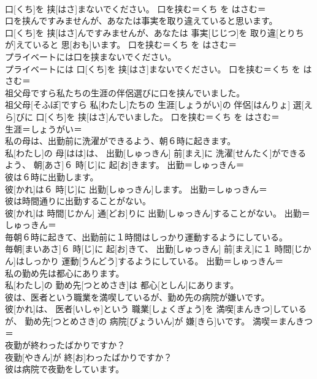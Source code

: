 \documentclass[8pt]{extreport}
\begin{document}
\begin{CJK}{UTF8}{min}
\\	口[くち]を 挟[はさ]まないでください。	口を挟む＝くち を はさむ＝ 
\\	口を挟んですみませんが、あなたは事実を取り違えていると思います。	
\\	口[くち]を 挟[はさ]んですみませんが、あなたは 事実[じじつ]を 取り違[とりちが]えていると 思[おも]います。	口を挟む＝くち を はさむ＝ 
\\	プライベートには口を挟まないでください。	
\\	プライベートには 口[くち]を 挟[はさ]まないでください。	口を挟む＝くち を はさむ＝ 
\\	祖父母ですら私たちの生涯の伴侶選びに口を挟んでいました。	
\\	祖父母[そふぼ]ですら 私[わたし]たちの 生涯[しょうがい]の 伴侶[はんりょ] 選[えら]びに 口[くち]を 挟[はさ]んでいました。	口を挟む＝くち を はさむ＝ 
\\	生涯＝しょうがい＝ 
\\	私の母は、出勤前に洗濯ができるよう、朝６時に起きます。	
\\	私[わたし]の 母[はは]は、 出勤[しゅっきん] 前[まえ]に 洗濯[せんたく]ができるよう、 朝[あさ]６ 時[じ]に 起[お]きます。	出勤＝しゅっきん＝ 
\\	彼は６時に出勤します。	
\\	彼[かれ]は６ 時[じ]に 出勤[しゅっきん]します。	出勤＝しゅっきん＝ 
\\	彼は時間通りに出勤することがない。	
\\	彼[かれ]は 時間[じかん] 通[どお]りに 出勤[しゅっきん]することがない。	出勤＝しゅっきん＝ 
\\	毎朝６時に起きて、出勤前に１時間はしっかり運動するようにしている。	
\\	毎朝[まいあさ]６ 時[じ]に 起[お]きて、 出勤[しゅっきん] 前[まえ]に１ 時間[じかん]はしっかり 運動[うんどう]するようにしている。	出勤＝しゅっきん＝ 
\\	私の勤め先は都心にあります。	
\\	私[わたし]の 勤め先[つとめさき]は 都心[としん]にあります。	
\\	彼は、医者という職業を満喫しているが、勤め先の病院が嫌いです。	
\\	彼[かれ]は、 医者[いしゃ]という 職業[しょくぎょう]を 満喫[まんきつ]しているが、 勤め先[つとめさき]の 病院[びょういん]が 嫌[きら]いです。	満喫＝まんきつ＝ 
\\	夜勤が終わったばかりですか？	
\\	夜勤[やきん]が 終[お]わったばかりですか？	
\\	彼は病院で夜勤をしています。	

\end{CJK}
\end{document}
